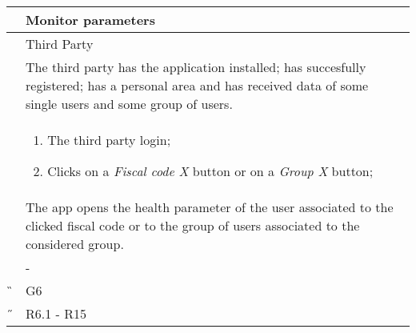 \begin{center}
	\begin{longtable}{ | p{} | p{} | }
		\hline
		 \A &  Monitor parameters\\ 

		\hline
		 \B &  Third Party \\ 

		\hline
  		 \C &  The third party has the application installed; has succesfully registered; has a personal area and has received data of some single users and some group of users.\\

		\hline
		\D & \begin{enumerate}
			\item The third party login;
			\item Clicks on a \textit{Fiscal code X} button or on a \textit{Group X} button;
		\end{enumerate} \\

		\hline
		\E & The app opens the health parameter of the user associated to the clicked fiscal code or to the group of users associated to the considered group.\\

		\hline
		\F & - \\
		
		\hline
		\G & G6\\

		\hline
		\H & R6.1 - R15 \\
		\hline

	\end{longtable}
\end{center}
